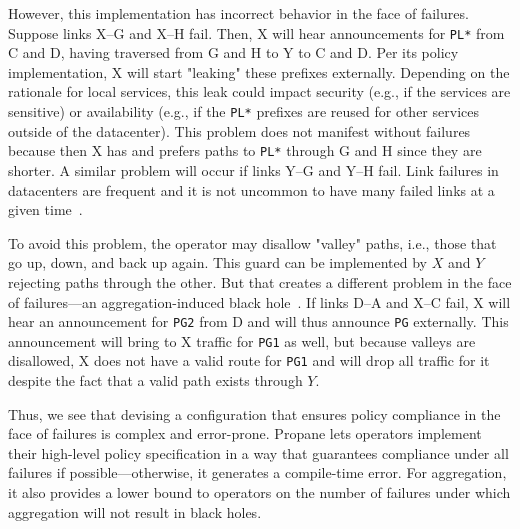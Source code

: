 \documentclass[10pt]{sigalternate052015}
\newcommand{\sysname}{{\small \sf Propane}\xspace}
\newcommand{\CD}[1]{\texttt{\small #1}}  %
\begin{document}
However, this implementation has incorrect behavior in the face of failures. Suppose links X--G and X--H fail. Then, X will hear announcements for \CD{PL*} from C and D, having traversed from G and H to Y to C and D. Per its policy implementation, X will start "leaking" these prefixes externally. Depending on the rationale for local services, this leak could impact security (e.g., if the services are sensitive) or availability (e.g., if the \CD{PL*} prefixes are reused for other services outside of the datacenter). This problem does not manifest without failures because then X has and prefers paths to \CD{PL*} through G and H since they are shorter. A similar problem will occur if links Y--G and Y--H fail.
Link failures in datacenters are frequent and it is not uncommon to have many failed links at a given time~\cite{dc-failure-study}.

To avoid this problem, the operator may disallow "valley" paths, i.e., those that go up, down, and back up again. This guard can be implemented by $X$ and $Y$ rejecting paths through the other. But that creates a different problem in the face of failures---an aggregation-induced black hole~\cite{route-aggregation}. If links D--A and X--C fail, X will hear an announcement for \CD{PG2} from D and will thus announce \CD{PG} externally. This announcement will bring to X traffic for \CD{PG1} as well, but because valleys are disallowed, X does not have a valid route for \CD{PG1} and will drop all traffic for it despite the fact that a valid path exists through $Y$.

Thus, we see that devising a configuration that ensures policy compliance in the face of failures is complex and error-prone. \sysname lets operators implement their high-level policy specification in a way that guarantees compliance under all failures if possible---otherwise, it generates a compile-time error. For aggregation, it also provides a lower bound to operators on the number of failures under which aggregation will not result in black holes.
\end{document}
